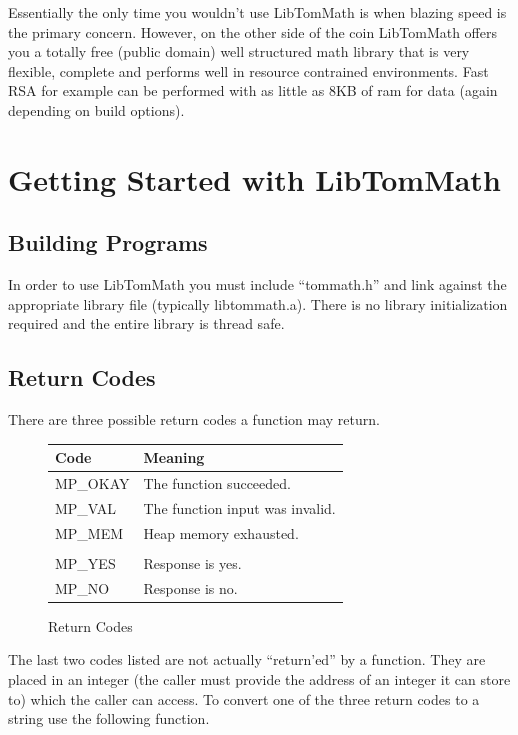 \documentclass[synpaper]{book}
\begin{document}
Essentially the only time you wouldn't use LibTomMath is when blazing speed is the primary concern.  However,
on the other side of the coin LibTomMath offers you a totally free (public domain) well structured math library
that is very flexible, complete and performs well in resource contrained environments.  Fast RSA for example can
be performed with as little as 8KB of ram for data (again depending on build options).  

\chapter{Getting Started with LibTomMath}
\section{Building Programs}
In order to use LibTomMath you must include ``tommath.h'' and link against the appropriate library file (typically 
libtommath.a).  There is no library initialization required and the entire library is thread safe.

\section{Return Codes}
There are three possible return codes a function may return.

\begin{figure}[here!]
\begin{center}
\begin{small}
\begin{tabular}{|l|l|}
\hline \textbf{Code} & \textbf{Meaning} \\
\hline MP\_OKAY & The function succeeded. \\
\hline MP\_VAL  & The function input was invalid. \\
\hline MP\_MEM  & Heap memory exhausted. \\
\hline &\\
\hline MP\_YES  & Response is yes. \\
\hline MP\_NO   & Response is no. \\
\hline
\end{tabular}
\end{small}
\end{center}
\caption{Return Codes}
\end{figure}

The last two codes listed are not actually ``return'ed'' by a function.  They are placed in an integer (the caller must
provide the address of an integer it can store to) which the caller can access.  To convert one of the three return codes
to a string use the following function.
\end{document}
